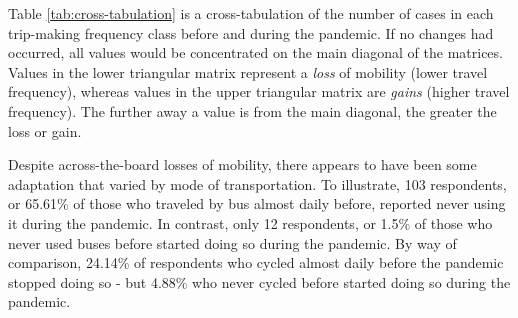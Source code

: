 \documentclass[]{elsarticle} %
\begin{document}
Table \ref{tab:cross-tabulation} is a cross-tabulation of the number of
cases in each trip-making frequency class before and during the
pandemic. If no changes had occurred, all values would be concentrated
on the main diagonal of the matrices. Values in the lower triangular
matrix represent a \emph{loss} of mobility (lower travel frequency),
whereas values in the upper triangular matrix are \emph{gains} (higher
travel frequency). The further away a value is from the main diagonal,
the greater the loss or gain.

Despite across-the-board losses of mobility, there appears to have been
some adaptation that varied by mode of transportation. To illustrate,
103 respondents, or 65.61\% of those who traveled by bus almost daily
before, reported never using it during the pandemic. In contrast, only
12 respondents, or 1.5\% of those who never used buses before started
doing so during the pandemic. By way of comparison, 24.14\% of
respondents who cycled almost daily before the pandemic stopped doing so
- but 4.88\% who never cycled before started doing so during the
pandemic.
\end{document}
